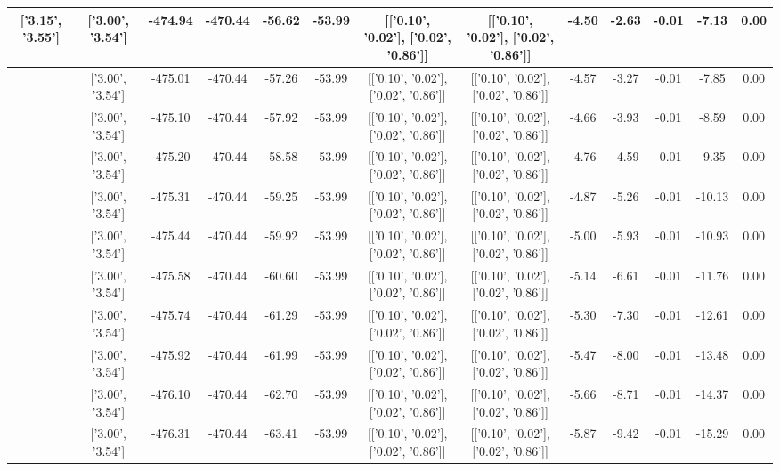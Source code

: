 \begin{table}[htbp]
\begin{adjustbox}{angle=90}
\begin{tabular}{|c|c|c|c|c|c|c|c|c|c|c|c|c|}
 ['3.15', '3.55'] & ['3.00', '3.54'] & -474.94 & -470.44 & -56.62 & -53.99 & [['0.10', '0.02'], ['0.02', '0.86']] & [['0.10', '0.02'], ['0.02', '0.86']] & -4.50 & -2.63 & -0.01 & -7.13 & 0.00\\ \hline
 ['3.19', '3.55'] & ['3.00', '3.54'] & -475.01 & -470.44 & -57.26 & -53.99 & [['0.10', '0.02'], ['0.02', '0.86']] & [['0.10', '0.02'], ['0.02', '0.86']] & -4.57 & -3.27 & -0.01 & -7.85 & 0.00\\ \hline
 ['3.23', '3.56'] & ['3.00', '3.54'] & -475.10 & -470.44 & -57.92 & -53.99 & [['0.10', '0.02'], ['0.02', '0.86']] & [['0.10', '0.02'], ['0.02', '0.86']] & -4.66 & -3.93 & -0.01 & -8.59 & 0.00\\ \hline
 ['3.27', '3.56'] & ['3.00', '3.54'] & -475.20 & -470.44 & -58.58 & -53.99 & [['0.10', '0.02'], ['0.02', '0.86']] & [['0.10', '0.02'], ['0.02', '0.86']] & -4.76 & -4.59 & -0.01 & -9.35 & 0.00\\ \hline
 ['3.31', '3.56'] & ['3.00', '3.54'] & -475.31 & -470.44 & -59.25 & -53.99 & [['0.10', '0.02'], ['0.02', '0.86']] & [['0.10', '0.02'], ['0.02', '0.86']] & -4.87 & -5.26 & -0.01 & -10.13 & 0.00\\ \hline
 ['3.34', '3.56'] & ['3.00', '3.54'] & -475.44 & -470.44 & -59.92 & -53.99 & [['0.10', '0.02'], ['0.02', '0.86']] & [['0.10', '0.02'], ['0.02', '0.86']] & -5.00 & -5.93 & -0.01 & -10.93 & 0.00\\ \hline
 ['3.38', '3.57'] & ['3.00', '3.54'] & -475.58 & -470.44 & -60.60 & -53.99 & [['0.10', '0.02'], ['0.02', '0.86']] & [['0.10', '0.02'], ['0.02', '0.86']] & -5.14 & -6.61 & -0.01 & -11.76 & 0.00\\ \hline
 ['3.42', '3.57'] & ['3.00', '3.54'] & -475.74 & -470.44 & -61.29 & -53.99 & [['0.10', '0.02'], ['0.02', '0.86']] & [['0.10', '0.02'], ['0.02', '0.86']] & -5.30 & -7.30 & -0.01 & -12.61 & 0.00\\ \hline
 ['3.46', '3.57'] & ['3.00', '3.54'] & -475.92 & -470.44 & -61.99 & -53.99 & [['0.10', '0.02'], ['0.02', '0.86']] & [['0.10', '0.02'], ['0.02', '0.86']] & -5.47 & -8.00 & -0.01 & -13.48 & 0.00\\ \hline
 ['3.50', '3.57'] & ['3.00', '3.54'] & -476.10 & -470.44 & -62.70 & -53.99 & [['0.10', '0.02'], ['0.02', '0.86']] & [['0.10', '0.02'], ['0.02', '0.86']] & -5.66 & -8.71 & -0.01 & -14.37 & 0.00\\ \hline
 ['3.53', '3.58'] & ['3.00', '3.54'] & -476.31 & -470.44 & -63.41 & -53.99 & [['0.10', '0.02'], ['0.02', '0.86']] & [['0.10', '0.02'], ['0.02', '0.86']] & -5.87 & -9.42 & -0.01 & -15.29 & 0.00\\ \hline

\end{tabular}
\end{adjustbox}
\end{table}
